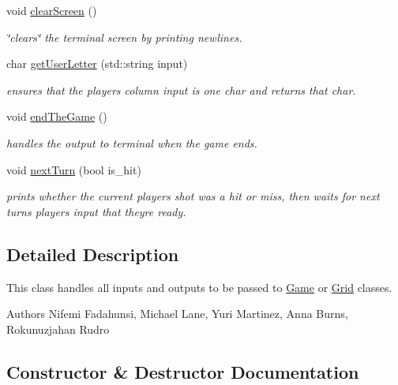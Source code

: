 \begin{DoxyCompactItemize}
void \hyperlink{classExecutive_a6b52a0ec7783ffed51d117d60781c364}{clear\+Screen} ()
\begin{DoxyCompactList}\small\item\em \char`\"{}clears\char`\"{} the terminal screen by printing newlines. \end{DoxyCompactList}\item 
char \hyperlink{classExecutive_afeb631927beaf50e17e5a0ee0b85895f}{get\+User\+Letter} (std\+::string input)
\begin{DoxyCompactList}\small\item\em ensures that the player\textquotesingle{}s column input is one char and returns that char. \end{DoxyCompactList}\item 
void \hyperlink{classExecutive_a7ecea33073bc684a8efdd3bd08f724e3}{end\+The\+Game} ()
\begin{DoxyCompactList}\small\item\em handles the output to terminal when the game ends. \end{DoxyCompactList}\item 
void \hyperlink{classExecutive_ad28543f2f3aff90f695b7cbe1cdaac3e}{next\+Turn} (bool is\+\_\+hit)
\begin{DoxyCompactList}\small\item\em prints whether the current player\textquotesingle{}s shot was a hit or miss, then waits for next turn\textquotesingle{}s player\textquotesingle{}s input that they\textquotesingle{}re ready. \end{DoxyCompactList}\end{DoxyCompactItemize}


\subsection{Detailed Description}
This class handles all inputs and outputs to be passed to \hyperlink{classGame}{Game} or \hyperlink{classGrid}{Grid} classes. 

\begin{DoxyAuthor}{Authors}
Nifemi Fadahunsi, Michael Lane, Yuri Martinez, Anna Burns, Rokunuzjahan Rudro 
\end{DoxyAuthor}


\subsection{Constructor \& Destructor Documentation}
\mbox{\label{classExecutive_ad870c1d741f1f313eb0c5a8336f8af6b}} 

